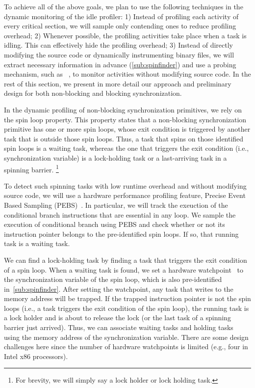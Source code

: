 To achieve all of the above goals, we plan to use the following
techniques in the dynamic monitoring of the idle profiler:
1) Instead of profiling each activity of every critical section, we
  will sample only contending ones to reduce profiling overhead;
2) Whenever possible, the profiling activities take place when a
  task is idling. This can effectively hide the profiling overhead;
3) Instead of directly modifying the source code or dynamically instrumenting
  binary files, we will extract necessary information in advance
  (\autoref{sub:spinfinder}) and use a probing mechanism, such as
  \kprobe~\cite{kprobes:doc}, to monitor activities without modifying
  source code.
In the rest of this section, we present in more detail our approach
and preliminary design for both non-blocking and blocking synchronization.

In the dynamic profiling of non-blocking synchronization primitives, we rely on the
spin loop property.
This property states that a non-blocking synchronization primitive has one or more
spin loops, whose exit condition is triggered by another task that is outside
those spin loops.
Thus, a task that spins on those identified spin loops is a waiting task,
whereas the one that triggers the exit condition (i.e., synchronization
variable) is a lock-holding task or a last-arriving task in a spinning
barrier.
\footnote{For brevity, we will simply say a lock holder or lock holding task.}

To detect such spinning tasks with low runtime overhead and without
modifying source code, we will use a hardware performance profiling
feature, Precise Event Based Sampling
(PEBS)~\cite{intel:sys-guide}. In particular, we will track the
exeuction of the conditional branch instructions that are essential in
any loop. We sample the execution of conditional branch using PEBS and
check whether or not its instruction pointer belongs to the pre-identified
spin loops. If so, that running task is a waiting task.

We can find a lock-holding task by finding a task that triggers the
exit condition of a spin loop. When a waiting task is found, we set a
hardware watchpoint~\cite{watchpoint:ols2009} to the
synchronization variable of the spin
loop, which is also pre-identified in~\autoref{sub:spinfinder}. After
setting the watchpoint, any task that writes to the memory address
will be trapped. If the trapped instruction pointer is not the spin
loops (i.e., a task triggers the exit condition of the spin loop), the
running task is a lock holder and is about to release the lock (or the
last task of a spinning barrier just arrived). Thus, we can associate
waiting tasks and holding tasks using the memory address of the
synchronization variable.
There are some design challenges here
since the number of hardware watchpoints is limited (e.g., four in
Intel x86 processors).

